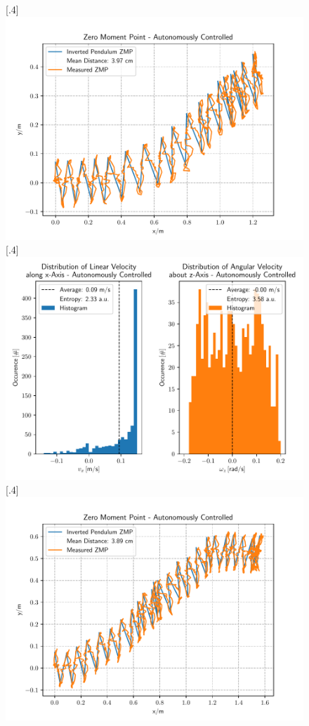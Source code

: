 \begin{figure}[h]
	\centering
	[.4\linewidth]{\includegraphics[scale=.35]{chapters/05_experiments/04_autonomous_walking/straight_walk_01_zmp.pdf}}
	[.4\linewidth]{\includegraphics[scale=.35]{chapters/05_experiments/04_autonomous_walking/straight_walk_01_entropy.pdf}}
	[.4\linewidth]{\includegraphics[scale=.35]{chapters/05_experiments/04_autonomous_walking/curved_walk_01_zmp.pdf}}

\end{figure}
